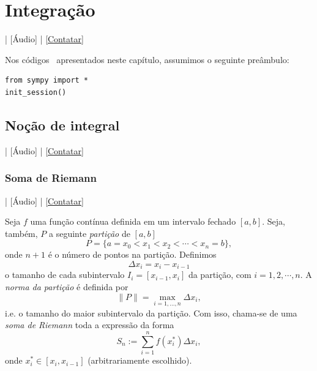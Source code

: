 
\chapter{Integração}\label{cap_int}
\thispagestyle{fancy}

\begin{flushright}
  [Vídeo] | [Áudio] | \href{https://phkonzen.github.io/notas/contato.html}{[Contatar]}
\end{flushright}

\ifispython
\begin{obs}\label{obs:cap_int_python}
  Nos códigos \python~apresentados neste capítulo, assumimos o seguinte preâmbulo:
\begin{verbatim}
from sympy import *
init_session()
\end{verbatim}
\end{obs}
\fi

\section{Noção de integral}\label{cap_int_sec_nocaoint}

\begin{flushright}
  [Vídeo] | [Áudio] | \href{https://phkonzen.github.io/notas/contato.html}{[Contatar]}
\end{flushright}

\subsection{Soma de Riemann}

\begin{flushright}
  [Vídeo] | [Áudio] | \href{https://phkonzen.github.io/notas/contato.html}{[Contatar]}
\end{flushright}

Seja $f$ uma função contínua definida em um intervalo fechado $[a, b]$. Seja, também, $P$ a seguinte \emph{partição} de $[a, b]$
\begin{equation}
  P = \{a=x_0<x_1<x_2<\cdots<x_n=b\},
\end{equation}
onde $n+1$ é o número de pontos na partição. Definimos
\begin{equation}
  \Delta x_i = x_{i} - x_{i-1}
\end{equation}
o tamanho de cada subintervalo $I_{i} = [x_{i-1}, x_{i}]$ da partição, com $i = 1, 2, \cdots, n$. A \emph{norma da partição} é definida por
\begin{equation}
  \|P\| = \max_{i=1, \dotsc, n} \Delta x_i,
\end{equation}
i.e. o tamanho do maior subintervalo da partição. Com isso, chama-se de uma \emph{soma de Riemann} toda a expressão da forma
\begin{equation}
  S_n := \sum_{i=1}^n f(x_i^*)\Delta x_i,
\end{equation}
onde $x_i^*\in [x_i, x_{i-1}]$ (arbitrariamente escolhido).

